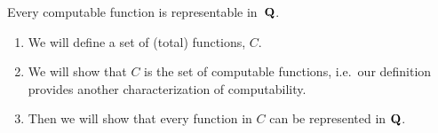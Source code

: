 \documentclass[../../../include/open-logic-section]{subfiles}
\begin{document}

\begin{lem}
Every computable function is representable in~$\mathbf{Q}$.
\end{lem}

\begin{enumerate}
\item We will define a set of (total) functions, $C$.
\item We will show that $C$ is the set of computable
  functions, i.e.\ our definition provides another characterization of
  computability.
\item Then we will show that every function in $C$ can be represented in
  $\mathbf{Q}$.
\end{enumerate}
\end{document}
